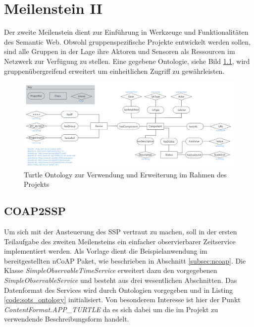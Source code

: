 \chapter{Meilenstein II}
\label{cha:ms2}

Der zweite Meilenstein dient zur Einführung in Werkzeuge und Funktionalitäten des Semantic Web. Obwohl gruppenspezifische Projekte entwickelt werden sollen, sind alle Gruppen in der Lage ihre Aktoren und Sensoren als Ressourcen im Netzwerk zur Verfügung zu stellen. Eine gegebene Ontologie, siehe Bild \ref{img:ontology}, wird gruppenübergreifend erweitert um einheitlichen Zugriff zu gewährleisten.


\begin{figure}
	\centering
	\includegraphics[width=1\textwidth]{figures/ontology.png}
	\caption{Turtle Ontology zur Verwendung und Erweiterung im Rahmen des Projekts}
	\label{img:ontology}
\end{figure}



\section{COAP2SSP}
\label{sec:coap2ssp}

Um sich mit der Ansteuerung des SSP vertraut zu machen, soll in der ersten Teilaufgabe des zweiten Meilensteins ein einfacher observierbarer Zeitservice implementiert werden. Als Vorlage dient die Beispielanwendung im bereitgestellten nCoAP Paket, wie beschrieben in Abschnitt \ref{subsec:ncoap}. Die Klasse \textit{SimpleObservableTimeService} erweitert dazu den vorgegebenen \textit{SimpleObservableService} und besteht aus drei wesentlichen Abschnitten. Das Datenformat des Services wird durch Ontologien vorgegeben und in Listing \ref{code:sots_ontology} initialisiert. Von besonderem Interesse ist hier der Punkt \textit{ContentFormat.APP\_TURTLE} da es sich dabei um die im Projekt zu verwendende Beschreibungsform handelt.


